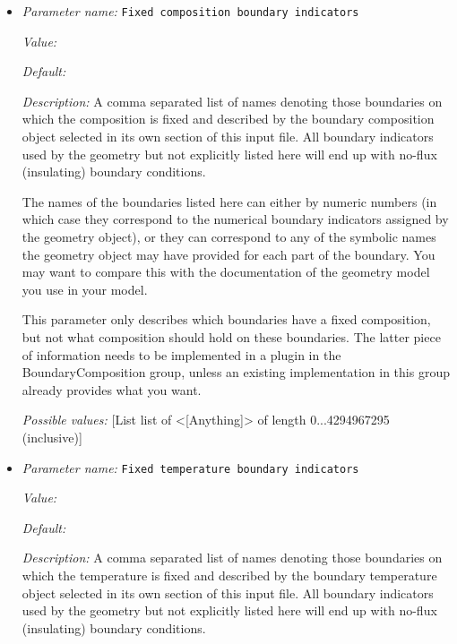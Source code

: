 \begin{itemize}
\item {\it Parameter name:} {\tt Fixed composition boundary indicators}
\label{parameters:Model settings/Fixed composition boundary indicators}


{\it Value:} 


{\it Default:} 


{\it Description:} A comma separated list of names denoting those boundaries on which the composition is fixed and described by the boundary composition object selected in its own section of this input file. All boundary indicators used by the geometry but not explicitly listed here will end up with no-flux (insulating) boundary conditions.

The names of the boundaries listed here can either by numeric numbers (in which case they correspond to the numerical boundary indicators assigned by the geometry object), or they can correspond to any of the symbolic names the geometry object may have provided for each part of the boundary. You may want to compare this with the documentation of the geometry model you use in your model.

This parameter only describes which boundaries have a fixed composition, but not what composition should hold on these boundaries. The latter piece of information needs to be implemented in a plugin in the BoundaryComposition group, unless an existing implementation in this group already provides what you want.


{\it Possible values:} [List list of <[Anything]> of length 0...4294967295 (inclusive)]
\item {\it Parameter name:} {\tt Fixed temperature boundary indicators}
\label{parameters:Model settings/Fixed temperature boundary indicators}


{\it Value:} 


{\it Default:} 


{\it Description:} A comma separated list of names denoting those boundaries on which the temperature is fixed and described by the boundary temperature object selected in its own section of this input file. All boundary indicators used by the geometry but not explicitly listed here will end up with no-flux (insulating) boundary conditions.


\end{itemize}
